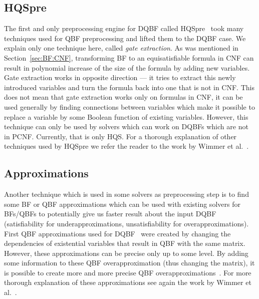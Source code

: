 \documentclass[
  digital, %
  color,
  twoside, %
  table,   %
  nolof,     %
  nolot,     %
]{fithesis3}
\theoremstyle{definition}
\theoremstyle{remark}
\begin{document}
\subsection{HQSpre}
\label{sec:HQSpre}
The first and only preprocessing engine for DQBF called HQSpre~\cite{HQSpre1,HQSpre2,HQSpreJournal} took many techniques used for QBF preprocessing and lifted them to the DQBF case. We explain only one technique here, called \emph{gate extraction}. As was mentioned in Section~\ref{sec:BF:CNF}, transforming BF to an equisatisfiable formula in CNF can result in polynomial increase of the size of the formula by adding new variables. Gate extraction works in opposite direction --- it tries to extract this newly introduced variables and turn the formula back into one that is not in CNF. This does not mean that gate extraction works only on formulas in CNF, it can be used generally by finding connections between variables which make it possible to replace a variable by some Boolean function of existing variables. However, this technique can only be used by solvers which can work on DQBFs which are not in PCNF. Currently, that is only HQS. For a thorough explanation of other techniques used by HQSpre we refer the reader to the work by Wimmer et al.~\cite{HQSpreJournal}. 

\subsection{Approximations}
Another technique which is used in some solvers as preprocessing step is to find some BF or QBF approximations which can be used with existing solvers for BFs/QBFs to potentially give us faster result about the input DQBF (satisfiability for underapproximations, unsatisfiability for overapproximations). First QBF approximations used for DQBF~\cite{HQSsimpleAlg} were created by changing the dependencies of existential variables that result in QBF with the same matrix. However, these approximations can be precise only up to some level. By adding some information to these QBF overapproximation (thus changing the matrix), it is possible to create more and more precise QBF overapproximations~\cite{FastDQBFRefutation}. For more thorough explanation of these approximations see again the work by Wimmer et al.~\cite[Section~3]{HQSpreJournal}.
\end{document}
